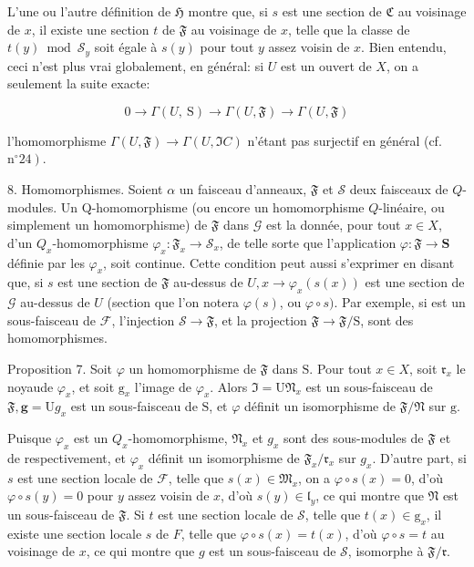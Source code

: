 L'une ou l'autre définition de $\mathfrak{H}$ montre que, si $s$ est une section de $\mathfrak{C}$ au voisinage de $x$, il existe une section $t$ de $\mathfrak{F}$ au voisinage de $x$, telle que la classe de $t(y) \bmod \mathcal{S}_{y}$ soit égale à $s(y)$ pour tout $y$ assez voisin de $x$. Bien entendu, ceci n'est plus vrai globalement, en général: si $U$ est un ouvert de $X$, on a seulement la suite exacte:

$$
0 \rightarrow \Gamma(U, \mathrm{~S}) \rightarrow \Gamma(U, \mathfrak{F}) \rightarrow \Gamma(U, \mathfrak{F})
$$

l'homomorphisme $\Gamma(U, \mathfrak{F}) \rightarrow \Gamma(U, \Im{C})$ n'étant pas surjectif en général (cf. $\left.\mathrm{n}^{\circ} 24\right)$.

8. Homomorphismes. Soient $\alpha$ un faisceau d'anneaux, $\mathfrak{F}$ et $\mathcal{S}$ deux faisceaux de $Q$-modules. Un Q-homomorphisme (ou encore un homomorphisme $Q$-linéaire, ou simplement un homomorphisme) de $\mathfrak{F}$ dans $\mathcal{G}$ est la donnée, pour tout $x \in X$, d'un $Q_{x}$-homomorphisme $\varphi_{x}: \mathfrak{F}_{x} \rightarrow \mathcal{S}_{x}$, de telle sorte que l'application $\varphi: \mathfrak{F} \rightarrow \mathbf{S}$ définie par les $\varphi_{x}$, soit continue. Cette condition peut aussi s'exprimer en disant que, si $s$ est une section de $\mathfrak{F}$ au-dessus de $U, x \rightarrow \varphi_{x}(s(x))$ est une section de $\mathcal{G}$ au-dessus de $U$ (section que l'on notera $\varphi(s)$, ou $\varphi \circ s) .$ Par exemple, si est un sous-faisceau de $\mathcal{F}$, l'injection $\mathcal{S} \rightarrow \mathfrak{F}$, et la projection $\mathfrak{F} \rightarrow \mathfrak{F} / \mathrm{S}$, sont des homomorphismes.

Proposition 7. Soit $\varphi$ un homomorphisme de $\mathfrak{F}$ dans $\mathrm{S}$. Pour tout $x \in X$, soit $\mathfrak{r}_{x}$ le noyaude $\varphi_{x}$, et soit $\mathrm{g}_{x}$ l'image de $\varphi_{x} .$ Alors $\mathfrak{I}=\mathrm{U} \mathfrak{N}_{x}$ est un sous-faisceau de $\mathfrak{F}, \boldsymbol{g}=\mathrm{U} g_{x}$ est un sous-faisceau de $\mathrm{S}$, et $\varphi$ définit un isomorphisme de $\mathfrak{F} / \mathfrak{N}$ sur $\mathrm{g}$.

Puisque $\varphi_{x}$ est un $Q_{x}$-homomorphisme, $\mathfrak{N}_{x}$ et $g_{x}$ sont des sous-modules de $\mathfrak{F}$ et de respectivement, et $\varphi_{x}$ définit un isomorphisme de $\mathfrak{F}_{x} / \mathfrak{r}_{x}$ sur $g_{x} .$ D'autre part, si $s$ est une section locale de $\mathcal{F}$, telle que $s(x) \in \mathfrak{M}_{x}$, on a $\varphi \circ s(x)=0$, d'où $\varphi \circ s(y)=0$ pour $y$ assez voisin de $x$, d'où $s(y) \in \mathfrak{l}_{y}$, ce qui montre que $\mathfrak{N}$ est un sous-faisceau de $\mathfrak{F} .$ Si $t$ est une section locale de $\mathcal{S}$, telle que $t(x) \in \mathrm{g}_{x}$, il existe une section locale $s$ de $F$, telle que $\varphi \circ s(x)=t(x)$, d'où $\varphi \circ s=t$ au voisinage de $x$, ce qui montre que $g$ est un sous-faisceau de $\mathcal{S}$, isomorphe à $\mathfrak{F} / \mathfrak{r}$.

